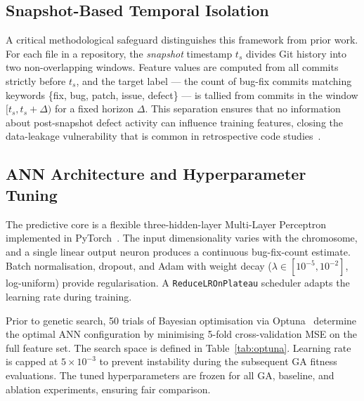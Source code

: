 \documentclass[11pt,a4paper]{article}
\begin{document}
\subsection{Snapshot-Based Temporal Isolation}
\label{subsec:snapshot}

A critical methodological safeguard distinguishes this framework from prior work.
For each file in a repository, the \emph{snapshot} timestamp $t_s$ divides Git
history into two non-overlapping windows. Feature values are computed from all
commits strictly before $t_s$, and the target label --- the count of bug-fix
commits matching keywords \{fix, bug, patch, issue, defect\} --- is tallied from
commits in the window $[t_s, t_s + \Delta)$ for a fixed horizon $\Delta$. This
separation ensures that no information about post-snapshot defect activity can
influence training features, closing the data-leakage vulnerability that is
common in retrospective code studies~\cite{dambros2012}.

\subsection{ANN Architecture and Hyperparameter Tuning}
\label{subsec:ann}

The predictive core is a flexible three-hidden-layer Multi-Layer Perceptron
implemented in PyTorch~\cite{pytorch2019}. The input dimensionality varies with
the chromosome, and a single linear output neuron produces a continuous
bug-fix-count estimate. Batch normalisation, dropout, and Adam with weight
decay ($\lambda \in [10^{-5}, 10^{-2}]$, log-uniform) provide regularisation.
A \texttt{ReduceLROnPlateau} scheduler adapts the learning rate during training.

Prior to genetic search, 50 trials of Bayesian optimisation
via Optuna~\cite{optuna2019} determine the optimal ANN configuration by
minimising 5-fold cross-validation MSE on the full feature set. The search
space is defined in Table~\ref{tab:optuna}. Learning rate is capped at
$5\times10^{-3}$ to prevent instability during the subsequent GA fitness
evaluations. The tuned hyperparameters are frozen for all GA, baseline, and
ablation experiments, ensuring fair comparison.
\end{document}
